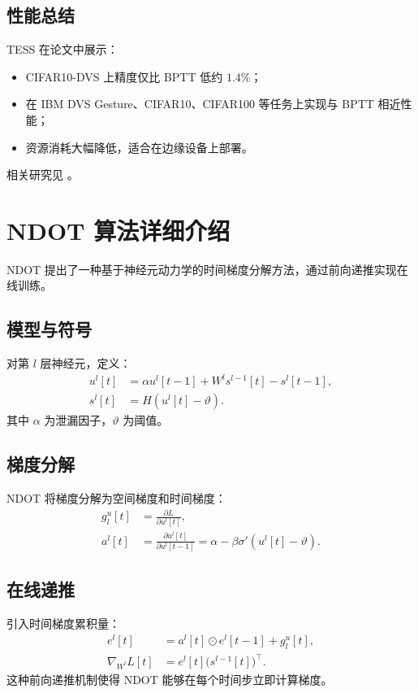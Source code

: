 \documentclass[journal,12pt,onecolumn]{IEEEtran}
\begin{document}
\subsection{性能总结}
TESS 在论文中展示：
\begin{itemize}
  \item CIFAR10-DVS 上精度仅比 BPTT 低约 $1.4\%$；
  \item 在 IBM DVS Gesture、CIFAR10、CIFAR100 等任务上实现与 BPTT 相近性能；
  \item 资源消耗大幅降低，适合在边缘设备上部署。
\end{itemize}

相关研究见 \cite{apolinario2025tess}。

\section{NDOT 算法详细介绍}
NDOT 提出了一种基于神经元动力学的时间梯度分解方法，通过前向递推实现在线训练。

\subsection{模型与符号}
对第 $l$ 层神经元，定义：
\begin{align}
  u^l[t] &= \alpha u^l[t-1] + W^l s^{l-1}[t] - s^l[t-1], \\
  s^l[t] &= H(u^l[t] - \vartheta).
\end{align}
其中 $\alpha$ 为泄漏因子，$\vartheta$ 为阈值。

\subsection{梯度分解}
NDOT 将梯度分解为空间梯度和时间梯度：
\begin{align}
  g^u_l[t] &= \frac{\partial L}{\partial u^l[t]}, \\
  a^l[t] &= \frac{\partial u^l[t]}{\partial u^l[t-1]} = \alpha - \beta \sigma'(u^l[t]-\vartheta).
\end{align}

\subsection{在线递推}
引入时间梯度累积量：
\begin{align}
  e^l[t] &= a^l[t] \odot e^l[t-1] + g^u_l[t], \\
  \nabla_{W^l} L[t] &= e^l[t] \bigl(s^{l-1}[t]\bigr)^\top.
\end{align}
这种前向递推机制使得 NDOT 能够在每个时间步立即计算梯度。
\end{document}
